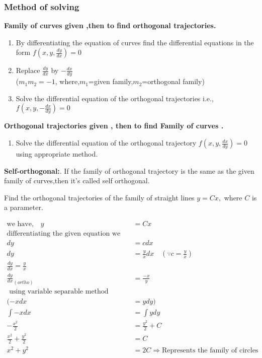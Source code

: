 \subsubsection{Method of solving}
\textbf{Family of curves given ,then to find orthogonal trajectories.}
\begin{enumerate}
	\item  By differentiating the equation of curves find the differential equations in the form $f\left(x, y, \frac{d y}{d x}\right)=0$
	\item  Replace $\frac{d y}{d x}$ by $-\frac{d x}{d y}$\\ ($ m_{1}m_{2}=-1$, where,$m_{1}$=given family,$m_{2}$=orthogonal  family)
	\item  Solve the differential equation of the orthogonal trajectories i.e., $f\left(x, y,-\frac{d x}{d y}\right)=0$
\end{enumerate}
\textbf{Orthogonal trajectories given , then to find Family of curves .}
\begin{enumerate}
	\item Solve the differential equation of the orthogonal trajectory $f\left(x, y,\frac{d x}{d y}\right)=0$ using appropriate method.
\end{enumerate}
\begin{note}
	\textbf{Self-orthogonal:}. If the family of orthogonal trajectory is the same as the given family of curves,then it's called self orthogonal.
\end{note}
\begin{exercise}
	 Find the orthogonal trajectories of the family of straight lines  $y=C x,$  where  $C$  is a parameter.
\end{exercise}
\begin{answer}
	\begin{align*}
	\text{we have,}\quad y&=C x\\
	\text{differentiating the given equation we get}\\
	dy&=cdx\\
	dy&=\frac{y}{x}dx\quad(\because c=\frac{y}{x})\\
	\frac{dy}{dx}=\frac{y}{x}\\
	{\frac{dy}{dx}}_{(ortho)}&=\frac{-x}{y}\\
	\text{ using variable separable method}\\
	(-xdx&=ydy)\\
	\int-xdx&=\int ydy\\
	-\frac{x^{2}}{2}&=\frac{y^{2}}{2}+C\\
		\frac{x^{2}}{2}+\frac{y^{2}}{2}&=C\\
		x^{2}+y^{2}&=2C\Longrightarrow \text{Represents the family of circles}
	\end{align*}
\end{answer}
